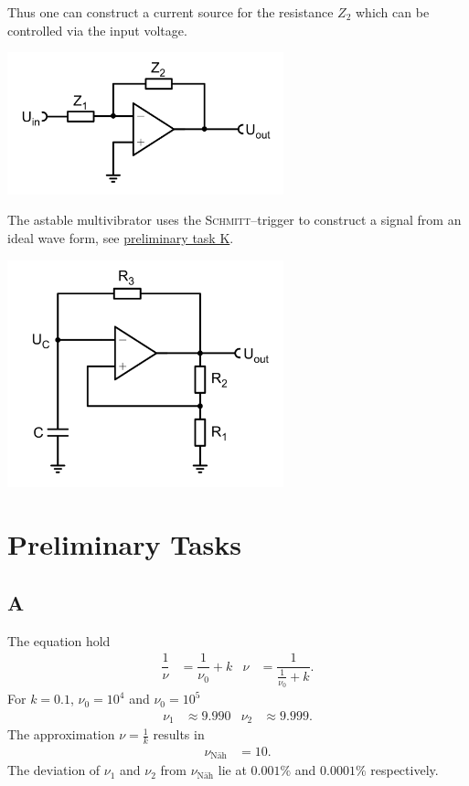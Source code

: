 \documentclass[a4paper,10pt]{article}
\newenvironment{Figure}
        {\par\medskip\noindent\minipage{\linewidth}}
        {\endminipage\par\medskip}
\numberwithin{equation}{section}
\begin{document}
\begin{multicols}{2}
	Thus one can construct a current source for the resistance $Z_2$ which can be controlled via the input voltage.
	\begin{Figure}
		\centering
		\includegraphics[width=0.6\textwidth]{inverting_amp.png}
	\end{Figure}
	\noindent The astable multivibrator uses the \textsc{Schmitt}--trigger to construct a signal from an ideal wave form, see \hyperref[pre:K]{preliminary task K}.
	\begin{Figure}
		\centering
		\includegraphics[width=0.6\textwidth]{astable_multivibrator.png}
	\end{Figure}

	\section{Preliminary Tasks}
	\subsection{A}
	The equation hold
	\begin{align}
		\dfrac{1}{\nu } & =\dfrac{1}{\nu _0}+k & \nu & =\dfrac{1}{\tfrac{1}{\nu _0}+k}
		.\end{align}
	For $k=0.1$, $\nu _0=10^4$ and $\nu _0=10^5$
	\begin{align}
		\nu _1 & \approx 9.990 & \nu _2 & \approx 9.999
		.\end{align}
	The approximation $\nu =\tfrac{1}{k}$ results in
	\begin{align}
		\nu _\text{Näh} & =10
		.\end{align}
	The deviation of $\nu _1$ and $\nu _2$ from $\nu _\text{Näh}$ lie at $0.001\%$ and $0.0001\%$ respectively.


\end{multicols}
\end{document}
